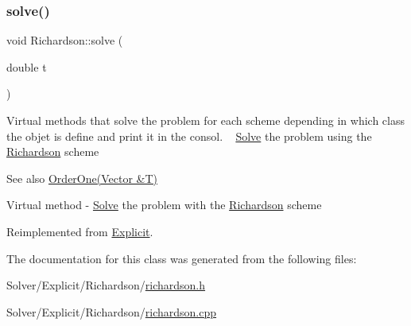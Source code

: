 \subsubsection{\texorpdfstring{solve()}{solve()}}
{\footnotesize\ttfamily void Richardson\+::solve (\begin{DoxyParamCaption}\item[{double}]{t }\end{DoxyParamCaption})\hspace{0.3cm}{\ttfamily [virtual]}}

Virtual methods that solve the problem for each scheme depending in which class the objet is define and print it in the consol. ~\newline
 \hyperlink{class_solve}{Solve} the problem using the \hyperlink{class_richardson}{Richardson} scheme \begin{DoxySeeAlso}{See also}
\hyperlink{class_explicit_a6069720017eb2bb0d989b2557c162c97}{Order\+One(\+Vector \&\+T)}
\end{DoxySeeAlso}
Virtual method -\/ \hyperlink{class_solve}{Solve} the problem with the \hyperlink{class_richardson}{Richardson} scheme 

Reimplemented from \hyperlink{class_explicit_ac99aa17bfd95f66b33e5c0ecf0e53785}{Explicit}.



The documentation for this class was generated from the following files\+:\begin{DoxyCompactItemize}
\item 
Solver/\+Explicit/\+Richardson/\hyperlink{richardson_8h}{richardson.\+h}\item 
Solver/\+Explicit/\+Richardson/\hyperlink{richardson_8cpp}{richardson.\+cpp}\end{DoxyCompactItemize}

